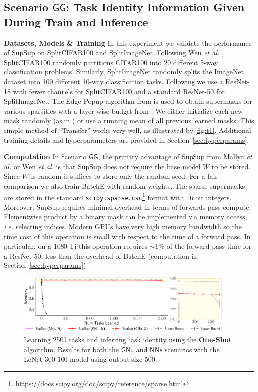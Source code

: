 \documentclass{article}
\newcommand{\ac}{SupSup\xspace}
\newcommand{\casename}[1]{\ensuremath{\mathsf{#1}}\xspace}
\begin{document}
\subsection{Scenario \casename{GG}: Task Identity Information Given During Train and Inference}\label{sec:exp-s1}

\textbf{Datasets, Models \& Training } In this experiment we validate the performance of \ac on SplitCIFAR100 and SplitImageNet. Following Wen \textit{et al.} \cite{wen2020batchensemble}, SplitCIFAR100 randomly partitions CIFAR100 \cite{cifar} into 20 different 5-way classification problems. 
Similarly, SplitImageNet randomly splits the ImageNet \cite{imagenet} dataset into 100 different 10-way classification tasks.
Following \cite{wen2020batchensemble} we use a ResNet-18 with fewer channels for SplitCIFAR100 and a standard ResNet-50 \cite{he2016deep} for SplitImageNet. The Edge-Popup algorithm from \cite{ramanujan2019s} is used to obtain supermasks for various sparsities with a layer-wise budget from  \cite{mocanu2018scalable}. We either initialize each new mask randomly (as in \cite{ramanujan2019s}) or use a running mean of all previous learned masks. This simple method of ``Transfer'' works very well, as illustrated by \autoref{fig:t1}. Additional training details and hyperparameters are provided in Section~\ref{sec:hyperparams}.

\textbf{Computation } In Scenario \casename{GG}, the primary advantage of \ac from Mallya \textit{et al.} \cite{mallya2018packnet} or Wen \textit{et al.} \cite{wen2020batchensemble} is that \ac does not require the base model $W$ to be stored. Since $W$ is random it suffices to store only the random seed. For a fair comparison we also train BatchE \cite{wen2020batchensemble} with random weights. The sparse supermasks are stored in the standard \texttt{scipy.sparse.csc}\footnote{\small{\url{https://docs.scipy.org/doc/scipy/reference/sparse.html}}} format with 16 bit integers. Moreover, \ac requires minimal overhead in terms of forwards pass compute. Elementwise product by a binary mask can be implemented via memory access, \textit{i.e.} selecting indices. Modern GPUs have very high memory bandwidth so the time cost of this operation is small with respect to the time of a forward pass. In particular, on a 1080 Ti this operation requires $\sim 1\%$ of the forward pass time for a ResNet-50, less than the overhead of BatchE (computation in Section~\ref{sec:hyperparams}).
\begin{figure}[t]
    \centering
    \includegraphics[width=0.94\textwidth]{figs/long_zoom.pdf}
    \caption{Learning 2500 tasks and inferring task identity using the \textbf{One-Shot} algorithm. Results for both the \casename{GNu} and \casename{NNs} scenarios with the LeNet 300-100 model using output size 500.}
    \label{fig:long-zoom}
    \vspace{-1em}
\end{figure}
\end{document}
